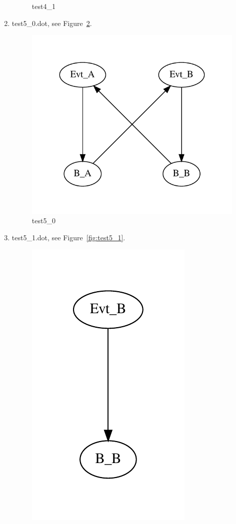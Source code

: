 \documentclass[12pt,a4paper]{report}
\begin{document}
\begin{enumerate}
\begin{figure}
        \caption{test4\_1}
        \label{fig:test4_1}
    \end{figure}
\item test5\_0.dot, see Figure~\ref{fig:test5_0}.
    \begin{figure}
        \centering
        \includegraphics*[width=1.0\textwidth,keepaspectratio]{TestPattern/test5_0.pdf}
        \caption{test5\_0}
        \label{fig:test5_0}
    \end{figure}
\item test5\_1.dot, see Figure~\ref{fig:test5_1}.
    \begin{figure}
        \centering
        \includegraphics{TestPattern/test5_1.pdf}

\end{figure}
\end{enumerate}
\end{document}
